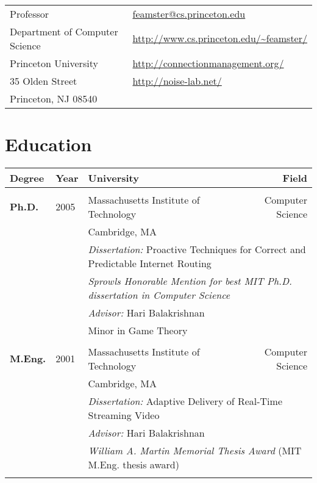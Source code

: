 \documentclass{article}
\begin{document}
\begin{cv}{}

\\

\begin{tabular}{p{3.25in}p{4in}}
\noindent 
Professor & \url{feamster@cs.princeton.edu} \\
Department of Computer Science & \url{http://www.cs.princeton.edu/~feamster/} \\
Princeton University  & \url{http://connectionmanagement.org/}\\
35 Olden Street &  \url{http://noise-lab.net/}\\
Princeton, NJ 08540 \\
\end{tabular}

\section*{Education}

\begin{center}
\begin{tabular}{p{.5in}lp{2.5in}r}

{\bf Degree} & {\bf Year} & {\bf University} & {\bf Field} \\
\hline \\
{\bf Ph.D.} & 2005 & Massachusetts Institute of Technology & Computer Science
\\
& & Cambridge, MA \\

&& \multicolumn{2}{l}{{\it Dissertation:} Proactive Techniques for
Correct and Predictable Internet Routing}\\ 
&& \multicolumn{2}{l}{{\em Sprowls Honorable Mention for best MIT
Ph.D. dissertation in Computer Science}} \\
&& {\it Advisor:}  Hari Balakrishnan \\
&& Minor in Game Theory \\
\\


{\bf M.Eng.} & 2001 & Massachusetts Institute of Technology & Computer Science
\\
& & Cambridge, MA \\
&& \multicolumn{2}{l}{{\it Dissertation:} Adaptive Delivery of Real-Time
Streaming Video}\\ 
&& {\it Advisor:}  Hari Balakrishnan \\
&& \multicolumn{2}{l}{{\em William A. Martin Memorial Thesis Award} (MIT
M.Eng. thesis award)} \\
\\



\end{tabular}
\end{center}
\end{cv}
\end{document}
